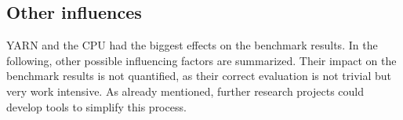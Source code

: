 % 
% 
% 
% 

\subsection{Other influences}
\label{chap:evaluation:influence-other}
YARN and the CPU had the biggest effects on the benchmark results. In the following, other possible influencing factors are summarized. Their impact on the benchmark results is not quantified, as their correct evaluation is not trivial but very work intensive. As already mentioned, further research projects could develop tools to simplify this process.

